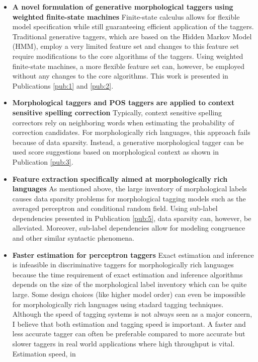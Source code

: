 \begin{itemize}
\item {\bf A novel formulation of generative morphological taggers
    using weighted finite-state machines} Finite-state calculus allows
  for flexible model specification while still guaranteeing efficient
  application of the taggers. Traditional generative taggers, which
  are based on the Hidden Markov Model (HMM), employ a very limited
  feature set and changes to this feature set require modifications to
  the core algorithms of the taggers. Using weighted finite-state
  machines, a more flexible feature set can, however, be employed
  without any changes to the core algorithms. This work is presented
  in Publications \ref{pub:1} and \ref{pub:2}.
\item {\bf Morphological taggers and POS taggers are applied to context
  sensitive spelling correction} Typically, context sensitive spelling
  correctors rely on neighboring words when estimating the probability
  of correction candidates. For morphologically rich languages, this
  approach fails because of data sparsity. Instead, a generative
  morphological tagger can be used score suggestions based on
  morphological context as shown in Publication \ref{pub:3}.
\item {\bf Feature extraction specifically aimed at morphologically
    rich languages} As mentioned above, the large inventory of
  morphological labels causes data sparsity problems for morphological
  tagging models such as the averaged perceptron and conditional
  random field. Using sub-label dependencies presented in Publication \ref{pub:5},
  data sparsity can, however, be alleviated. Moreover, sub-label
  dependencies allow for modeling congruence and other similar
  syntactic phenomena.
\item {\bf Faster estimation for perceptron taggers} Exact estimation
  and inference is infeasible in discriminative taggers for
  morphologically rich languages because the time requirement of exact
  estimation and inference algorithms depends on the size of the
  morphological label inventory which can be quite large. Some design
  choices (like higher model order) can even be impossible for
  morphologically rich languages using stadard tagging
  techniques. Although the speed of tagging systems is not always seen
  as a major concern, I believe that both estimation and tagging speed
  is important. A faster and less accurate tagger can often be
  preferable compared to more accurate but slower taggers in real world
  applications where high throughput is vital. Estimation speed, in

\end{itemize}
